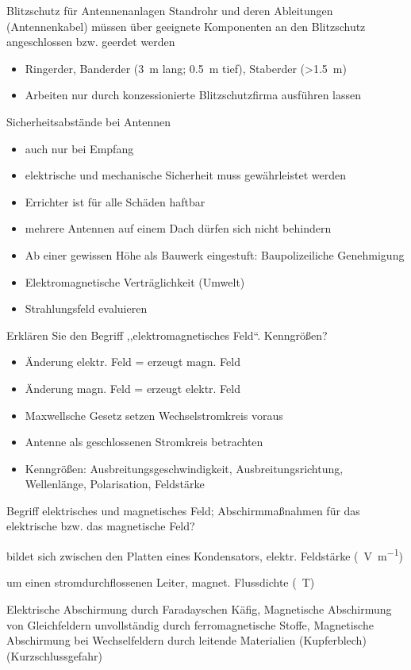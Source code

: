 \documentclass[avery5371,grid,frame,a4paper]{flashcards}
\newcommand{\card}[3]{
  \begin{flashcard}[{\chap} -- #1]{#2}#3\end{flashcard}
}
\begin{document}
\card{83}{Blitzschutz für Antennenanlagen}{
  Standrohr und deren Ableitungen (Antennenkabel) müssen über geeignete Komponenten an den Blitzschutz angeschlossen bzw. geerdet werden

  \begin{itemize}
    \item Ringerder, Banderder (\SI{3}{\metre} lang; \SI{0,5}{\metre} tief), Staberder (>\SI{1,5}{\metre})
    \item Arbeiten nur durch konzessionierte Blitzschutzfirma ausführen lassen
  \end{itemize}
}
\card{84}{Sicherheitsabstände bei Antennen}{
  \small
  \begin{itemize}
    \item auch nur bei Empfang
    \item elektrische und mechanische Sicherheit muss gewährleistet werden
    \item Errichter ist für alle Schäden haftbar
    \item mehrere Antennen auf einem Dach dürfen sich nicht behindern
    \item Ab einer gewissen Höhe als Bauwerk eingestuft: Baupolizeiliche Genehmigung
    \item Elektromagnetische Verträglichkeit (Umwelt)
    \item Strahlungsfeld evaluieren
  \end{itemize}
}
\card{85}{Erklären Sie den Begriff ,,elektromagnetisches Feld``. Kenngrößen?}{
  \begin{itemize}
    \item Änderung elektr. Feld = erzeugt magn. Feld
    \item Änderung magn. Feld = erzeugt elektr. Feld
    \item Maxwellsche Gesetz setzen Wechselstromkreis voraus
    \item Antenne als geschlossenen Stromkreis betrachten
    \item Kenngrößen: Ausbreitungsgeschwindigkeit, Ausbreitungsrichtung, Wellenlänge, Polarisation, Feldstärke
  \end{itemize}
}
\card{86}{Begriff elektrisches und magnetisches Feld; Abschirmmaßnahmen für das elektrische bzw. das magnetische Feld?}{
  \begin{description}\itemsep0pt
    \item[elektrisches Feld] bildet sich zwischen den Platten eines Kondensators, elektr. Feldstärke (\SI{}{\volt\per\metre})
    \item[magnetisches Feld] um einen stromdurchflossenen Leiter, magnet. Flussdichte (\SI{}{\tesla})
    \item[Abschirmmaßnahmen]
      Elektrische Abschirmung durch Faradayschen Käfig,
      Magnetische Abschirmung von Gleichfeldern unvollständig durch ferromagnetische Stoffe,
      Magnetische Abschirmung bei Wechselfeldern durch leitende Materialien (Kupferblech) (Kurzschlussgefahr)
  \end{description}
}
\end{document}
